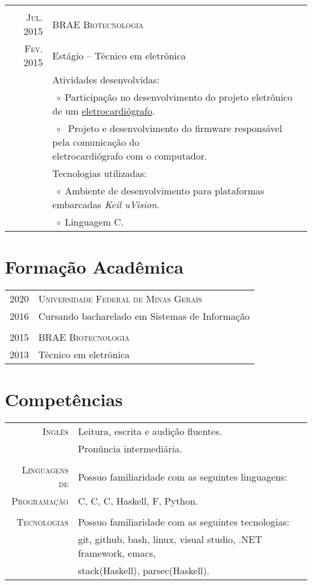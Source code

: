 \documentclass[a4paper,10pt]{article}
\newcommand{\tabitem}{$\;\circ\;$}
\newcommand{\cpp}{C\protect\scalebox{0.8}{\protect\raisebox{0.4ex}{++}}}
\renewcommand\#{\protect\scalebox{0.8}{\protect\raisebox{0.4ex}{\char"0023}}}
\begin{document}
\begin{tabular}{r|p{12.3cm}}
  \multicolumn{2}{c}{} \\
  \textsc{Jul. 2015} & \textsc{BRAE Biotecnologia} \\
  \textsc{Fev. 2015} & Estágio -- Técnico em eletrônica \\[5pt]
  & Atividades desenvolvidas: \\
  & \tabitem Participação no desenvolvimento do projeto eletrônico de um \href{http://www.ferox.vet.br/pt-br/produtos/ecg-veterinario.aspx}{eletrocardiógrafo}. \\
  & \tabitem \makecell[lt]{
              Projeto e desenvolvimento do firmware responsável pela comunicação do \\
              eletrocardiógrafo com o computador.
             } \\
  & Tecnologias utilizadas: \\
  & \tabitem Ambiente de desenvolvimento para plataformas embarcadas \textit{Keil uVision}. \\
  & \tabitem Linguagem C.
\end{tabular}


\section{Formação Acadêmica}
\begin{tabular}{r|l}
  \textsc{2020} & \textsc{Universidade Federal de Minas Gerais} \\
  \textsc{2016} & Cursando bacharelado em Sistemas de Informação \\
  
  \multicolumn{2}{c}{} \\
  \textsc{2015} & \textsc{BRAE Biotecnologia} \\
  \textsc{2013} & Técnico em eletrônica \\
\end{tabular}


\section{Competências}
\begin{tabular}{r|l}
  \textsc{Inglês} & Leitura, escrita e audição fluentes. \\
  & Pronúncia intermediária. \\
  
  \multicolumn{2}{c}{} \\
  \textsc{Linguagens de} & Possuo familiaridade com as seguintes linguagens: \\
  \textsc{Programação}& C, \cpp, C\#, Haskell, F\#, Python. \\
  
  \multicolumn{2}{c}{} \\
  \textsc{Tecnologias} & Possuo familiaridade com as seguintes tecnologias: \\
  & git, github, bash, linux, visual studio, .NET framework, emacs, \\
  & stack(Haskell), parsec(Haskell).
\end{tabular}
\end{document}
